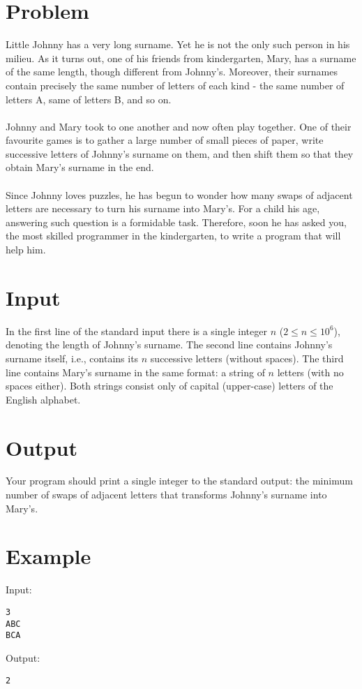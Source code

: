 \documentclass[11pt]{article}
\begin{document}
\section*{Problem}
Little Johnny has a very long surname. Yet he is not the only such person in his
milieu. As it turns out, one of his friends from kindergarten, Mary, has a
surname of the same length, though different from Johnny's. Moreover, their
surnames contain precisely the same number of letters of each kind - the same
number of letters A, same of letters B, and so on.
\\\\
\noindent Johnny and Mary took to one another and now often play together. One of their
favourite games is to gather a large number of small pieces of paper, write
successive letters of Johnny's surname on them, and then shift them so that they
obtain Mary's surname in the end.
\\\\
\noindent Since Johnny loves puzzles, he has begun to wonder how many swaps of adjacent
letters are necessary to turn his surname into Mary's. For a child his age,
answering such question is a formidable task. Therefore, soon he has asked you,
the most skilled programmer in the kindergarten, to write a program that will
help him.
\section*{Input}
In the first line of the standard input there is a single integer $n$ ($2 \leq n
\leq 10^6$), denoting the length of Johnny's surname. The second line contains
Johnny's surname itself, i.e., contains its $n$ successive letters (without
spaces). The third line contains Mary's surname in the same format: a string of
$n$ letters (with no spaces either). Both strings consist only of capital
(upper-case) letters of the English alphabet.
\section*{Output}
Your program should print a single integer to the standard output: the minimum
number of swaps of adjacent letters that transforms Johnny's surname into
Mary's.
\section*{Example}
Input:

\begin{verbatim}
3
ABC
BCA
\end{verbatim}

\noindent Output:

\begin{verbatim}
2
\end{verbatim}
\end{document}
